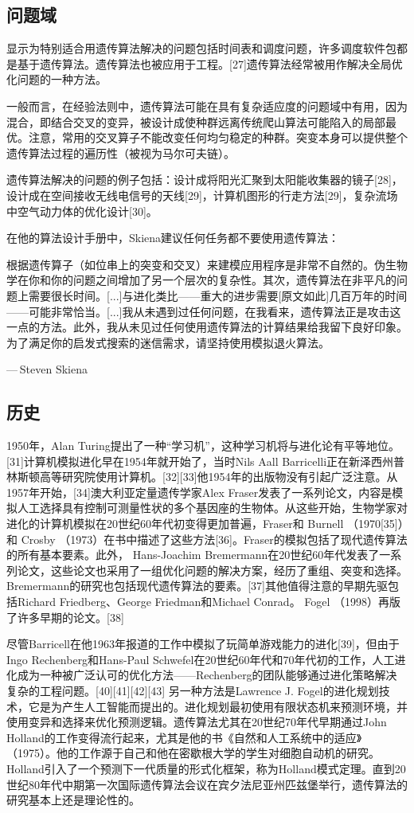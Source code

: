 \subsection{问题域}
显示为特别适合用遗传算法解决的问题包括时间表和调度问题，许多调度软件包都是基于遗传算法。遗传算法也被应用于工程。[27]遗传算法经常被用作解决全局优化问题的一种方法。

一般而言，在经验法则中，遗传算法可能在具有复杂适应度的问题域中有用，因为混合，即结合交叉的变异，被设计成使种群远离传统爬山算法可能陷入的局部最优。注意，常用的交叉算子不能改变任何均匀稳定的种群。突变本身可以提供整个遗传算法过程的遍历性（被视为马尔可夫链）。

遗传算法解决的问题的例子包括：设计成将阳光汇聚到太阳能收集器的镜子[28]，设计成在空间接收无线电信号的天线[29]，计算机图形的行走方法[29]，复杂流场中空气动力体的优化设计[30]。

在他的算法设计手册中，Skiena建议任何任务都不要使用遗传算法：

根据遗传算子（如位串上的突变和交叉）来建模应用程序是非常不自然的。伪生物学在你和你的问题之间增加了另一个层次的复杂性。其次，遗传算法在非平凡的问题上需要很长时间。[...]与进化类比——重大的进步需要[原文如此]几百万年的时间——可能非常恰当。[...]我从未遇到过任何问题，在我看来，遗传算法正是攻击这一点的方法。此外，我从未见过任何使用遗传算法的计算结果给我留下良好印象。为了满足你的启发式搜索的迷信需求，请坚持使用模拟退火算法。

— Steven Skiena

\subsection{历史}
1950年，Alan Turing提出了一种“学习机”，这种学习机将与进化论有平等地位。[31]计算机模拟进化早在1954年就开始了，当时Nils Aall Barricelli正在新泽西州普林斯顿高等研究院使用计算机。[32][33]他1954年的出版物没有引起广泛注意。从1957年开始，[34]澳大利亚定量遗传学家Alex Fraser发表了一系列论文，内容是模拟人工选择具有控制可测量性状的多个基因座的生物体。从这些开始，生物学家对进化的计算机模拟在20世纪60年代初变得更加普遍，Fraser和 Burnell （1970[35]）和 Crosby （1973）在书中描述了这些方法[36]。Fraser的模拟包括了现代遗传算法的所有基本要素。此外， Hans-Joachim Bremermann在20世纪60年代发表了一系列论文，这些论文也采用了一组优化问题的解决方案，经历了重组、突变和选择。Bremermann的研究也包括现代遗传算法的要素。[37]其他值得注意的早期先驱包括Richard Friedberg、George Friedman和Michael Conrad。 Fogel （1998）再版了许多早期的论文。[38]

尽管Barricell在他1963年报道的工作中模拟了玩简单游戏能力的进化[39]，但由于Ingo Rechenberg和Hans-Paul Schwefel在20世纪60年代和70年代初的工作，人工进化成为一种被广泛认可的优化方法——Rechenberg的团队能够通过进化策略解决复杂的工程问题。[40][41][42][43] 另一种方法是Lawrence J. Fogel的进化规划技术，它是为产生人工智能而提出的。进化规划最初使用有限状态机来预测环境，并使用变异和选择来优化预测逻辑。遗传算法尤其在20世纪70年代早期通过John Holland的工作变得流行起来，尤其是他的书《自然和人工系统中的适应》（1975）。他的工作源于自己和他在密歇根大学的学生对细胞自动机的研究。Holland引入了一个预测下一代质量的形式化框架，称为Holland模式定理。直到20世纪80年代中期第一次国际遗传算法会议在宾夕法尼亚州匹兹堡举行，遗传算法的研究基本上还是理论性的。

